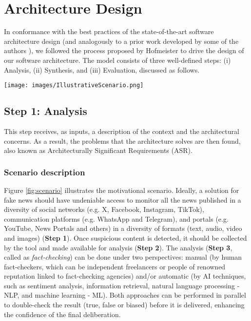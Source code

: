 \section{Architecture Design} 
\label{sec:design}

In conformance with the best practices of the state-of-the-art software architecture design (and analogously to a prior work developed by some of the authors \cite{TeixeiraL2020}), we followed the process proposed by Hofmeister \cite{HOFMEISTER2007} to drive the design of our software architecture. The model consists of three well-defined steps: (i) Analysis, (ii) Synthesis, and (iii) Evaluation, discussed as follows.

\begin{figure*}[ht]
\centering
\texttt{[image: images/IllustrativeScenario.png]}
\caption{Illustration of the Motivational Scenario on Fake News processing. Extracted from Private Technical Report \cite{techReport}.}
\label{fig:scenario}
\end{figure*}

\subsection{Step 1: Analysis}

This step receives, as inputs, a description of the context and the architectural concerns. As a result, the problems that the architecture solves are then found, also known as Architecturally Significant Requirements (ASR).

\subsubsection{Scenario description}

Figure \ref{fig:scenario} illustrates the motivational scenario. Ideally, a solution for fake news should have undeniable access to monitor all the news published in a diversity of social networks (e.g. X, Facebook, Instagram, TikTok), communication platforms (e.g. WhatsApp and Telegram), and portals (e.g. YouTube, News Portals and others) in a diversity of formats (text, audio, video and images) (\textbf{Step 1}). Once suspicious content is detected, it should be collected by the tool and made available for analysis (\textbf{Step 2}). The analysis (\textbf{Step 3}, called as \textit{fact-checking}) can be done under two perspectives: manual (by human fact-checkers, which can be independent freelancers or people of renowned reputation linked to fact-checking agencies) and/or automatic (by AI techniques, such as sentiment analysis, information retrieval, natural language processing - NLP, and machine learning - ML). Both approaches can be performed in parallel to double-check the result (true, false or biased) before it is delivered, enhancing the confidence of the final deliberation.

